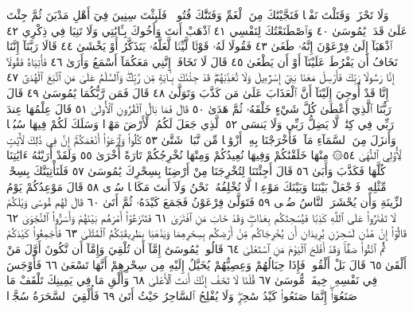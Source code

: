 وَلَا تَحْزَنَۚ وَقَتَلْتَ نَفْسࣰا فَنَجَّيْنَٰكَ مِنَ ٱلْغَمِّ وَفَتَنَّٰكَ فُتُونࣰاۚ
فَلَبِثْتَ سِنِينَ فِيٓ أَهْلِ مَدْيَنَ ثُمَّ جِئْتَ عَلَىٰ قَدَرࣲ يَٰمُوسَىٰ ٤٠
وَٱصْطَنَعْتُكَ لِنَفْسِي ٤١ ٱذْهَبْ أَنتَ وَأَخُوكَ بِـَٔايَٰتِي وَلَا
تَنِيَا فِي ذِكْرِي ٤٢ ٱذْهَبَآ إِلَىٰ فِرْعَوْنَ إِنَّهُۥ طَغَىٰ ٤٣ فَقُولَا لَهُۥ قَوْلࣰا
لَّيِّنࣰا لَّعَلَّهُۥ يَتَذَكَّرُ أَوْ يَخْشَىٰ ٤٤ قَالَا رَبَّنَآ إِنَّنَا نَخَافُ أَن يَفْرُطَ
عَلَيْنَآ أَوْ أَن يَطْغَىٰ ٤٥ قَالَ لَا تَخَافَآۖ إِنَّنِي مَعَكُمَآ أَسْمَعُ وَأَرَىٰ ٤٦
فَأْتِيَاهُ فَقُولَآ إِنَّا رَسُولَا رَبِّكَ فَأَرْسِلْ مَعَنَا بَنِيٓ إِسْرَٰٓءِيلَ
وَلَا تُعَذِّبْهُمْۖ قَدْ جِئْنَٰكَ بِـَٔايَةࣲ مِّن رَّبِّكَۖ وَٱلسَّلَٰمُ عَلَىٰ مَنِ ٱتَّبَعَ
ٱلْهُدَىٰٓ ٤٧ إِنَّا قَدْ أُوحِيَ إِلَيْنَآ أَنَّ ٱلْعَذَابَ عَلَىٰ مَن كَذَّبَ
وَتَوَلَّىٰ ٤٨ قَالَ فَمَن رَّبُّكُمَا يَٰمُوسَىٰ ٤٩ قَالَ رَبُّنَا ٱلَّذِيٓ أَعْطَىٰ
كُلَّ شَيْءٍ خَلْقَهُۥ ثُمَّ هَدَىٰ ٥٠ قَالَ فَمَا بَالُ ٱلْقُرُونِ ٱلْأُولَىٰ ٥١
قَالَ عِلْمُهَا عِندَ رَبِّي فِي كِتَٰبࣲۖ لَّا يَضِلُّ رَبِّي وَلَا يَنسَى ٥٢ ٱلَّذِي
جَعَلَ لَكُمُ ٱلْأَرْضَ مَهْدࣰا وَسَلَكَ لَكُمْ فِيهَا سُبُلࣰا وَأَنزَلَ مِنَ
ٱلسَّمَآءِ مَآءࣰ فَأَخْرَجْنَا بِهِۦٓ أَزْوَٰجࣰا مِّن نَّبَاتࣲ شَتَّىٰ ٥٣ كُلُوا۟
وَٱرْعَوْا۟ أَنْعَٰمَكُمْۚ إِنَّ فِي ذَٰلِكَ لَأٓيَٰتࣲ لِّأُو۟لِي ٱلنُّهَىٰ ٥٤۞ مِنْهَا
خَلَقْنَٰكُمْ وَفِيهَا نُعِيدُكُمْ وَمِنْهَا نُخْرِجُكُمْ تَارَةً أُخْرَىٰ ٥٥ وَلَقَدْ
أَرَيْنَٰهُ ءَايَٰتِنَا كُلَّهَا فَكَذَّبَ وَأَبَىٰ ٥٦ قَالَ أَجِئْتَنَا لِتُخْرِجَنَا
مِنْ أَرْضِنَا بِسِحْرِكَ يَٰمُوسَىٰ ٥٧ فَلَنَأْتِيَنَّكَ بِسِحْرࣲ مِّثْلِهِۦ
فَٱجْعَلْ بَيْنَنَا وَبَيْنَكَ مَوْعِدࣰا لَّا نُخْلِفُهُۥ نَحْنُ وَلَآ أَنتَ مَكَانࣰا
سُوࣰى ٥٨ قَالَ مَوْعِدُكُمْ يَوْمُ ٱلزِّينَةِ وَأَن يُحْشَرَ ٱلنَّاسُ ضُحࣰى ٥٩
فَتَوَلَّىٰ فِرْعَوْنُ فَجَمَعَ كَيْدَهُۥ ثُمَّ أَتَىٰ ٦٠ قَالَ لَهُم
مُّوسَىٰ وَيْلَكُمْ لَا تَفْتَرُوا۟ عَلَى ٱللَّهِ كَذِبࣰا فَيُسْحِتَكُم بِعَذَابࣲۖ
وَقَدْ خَابَ مَنِ ٱفْتَرَىٰ ٦١ فَتَنَٰزَعُوٓا۟ أَمْرَهُم بَيْنَهُمْ وَأَسَرُّوا۟
ٱلنَّجْوَىٰ ٦٢ قَالُوٓا۟ إِنْ هَٰذَٰنِ لَسَٰحِرَٰنِ يُرِيدَانِ أَن يُخْرِجَاكُم
مِّنْ أَرْضِكُم بِسِحْرِهِمَا وَيَذْهَبَا بِطَرِيقَتِكُمُ ٱلْمُثْلَىٰ ٦٣
فَأَجْمِعُوا۟ كَيْدَكُمْ ثُمَّ ٱئْتُوا۟ صَفࣰّاۚ وَقَدْ أَفْلَحَ ٱلْيَوْمَ مَنِ ٱسْتَعْلَىٰ ٦٤
قَالُوا۟ يَٰمُوسَىٰٓ إِمَّآ أَن تُلْقِيَ وَإِمَّآ أَن نَّكُونَ أَوَّلَ مَنْ أَلْقَىٰ ٦٥ قَالَ بَلْ
أَلْقُوا۟ۖ فَإِذَا حِبَالُهُمْ وَعِصِيُّهُمْ يُخَيَّلُ إِلَيْهِ مِن سِحْرِهِمْ أَنَّهَا
تَسْعَىٰ ٦٦ فَأَوْجَسَ فِي نَفْسِهِۦ خِيفَةࣰ مُّوسَىٰ ٦٧ قُلْنَا لَا تَخَفْ إِنَّكَ
أَنتَ ٱلْأَعْلَىٰ ٦٨ وَأَلْقِ مَا فِي يَمِينِكَ تَلْقَفْ مَا صَنَعُوٓا۟ۖ إِنَّمَا صَنَعُوا۟
كَيْدُ سَٰحِرࣲۖ وَلَا يُفْلِحُ ٱلسَّاحِرُ حَيْثُ أَتَىٰ ٦٩ فَأُلْقِيَ ٱلسَّحَرَةُ سُجَّدࣰا
